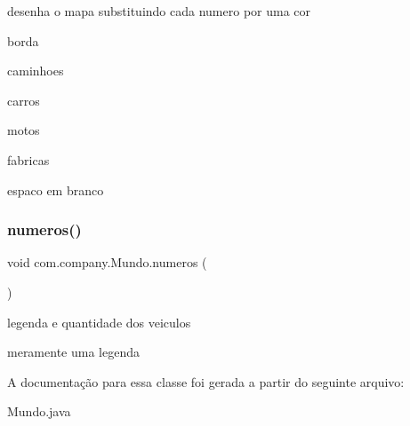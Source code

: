 desenha o mapa substituindo cada numero por uma cor 

borda

caminhoes

carros

motos

fabricas

espaco em branco \mbox{\label{classcom_1_1company_1_1_mundo_afd89839275a49ac20884b5e402ae374a}} 
\subsubsection{\texorpdfstring{numeros()}{numeros()}}
{\footnotesize\ttfamily void com.\+company.\+Mundo.\+numeros (\begin{DoxyParamCaption}{ }\end{DoxyParamCaption})\hspace{0.3cm}{\ttfamily [inline]}}



legenda e quantidade dos veiculos 

meramente uma legenda 

A documentação para essa classe foi gerada a partir do seguinte arquivo\+:\begin{DoxyCompactItemize}
\item 
Mundo.\+java\end{DoxyCompactItemize}
